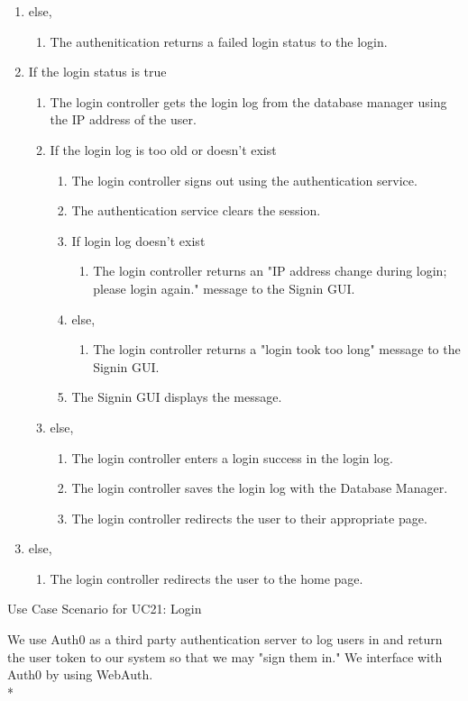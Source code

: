 \documentclass[11pt]{article}
\begin{document}
\begin{table}[H]
{{\begin{enumerate}[label=4.\arabic*.]
			\item else, 
			\begin{enumerate}[label*=\arabic*.]
				\item The authenitication returns a failed login status to the login.
			\end{enumerate}
			\item If the login status is true
			\begin{enumerate}[label*=\arabic*.]
				\item The login controller gets the login log from the database manager using the IP address of the user.
				\item If the login log is too old or doesn't exist
				\begin{enumerate}[label*=\arabic*.]
					\item The login controller signs out using the authentication service.
					\item The authentication service clears the session.
					\item If login log doesn't exist
					\begin{enumerate}[label*=\arabic*.]
						\item The login controller returns an "IP address change during login; please login again." message to the Signin GUI.
					\end{enumerate}
					\item else, 
					\begin{enumerate}[label*=\arabic*.]
						\item The login controller returns a "login took too long" message to the Signin GUI. 
					\end{enumerate}
					\item The Signin GUI displays the message.
				\end{enumerate}
				\item else,
				\begin{enumerate}[label*=\arabic*.]
					\item The login controller enters a login success in the login log.
					\item The login controller saves the login log with the Database Manager.
					\item The login controller redirects the user to their appropriate page. 
				\end{enumerate}
			\end{enumerate}
			\item else,
			\begin{enumerate}[label*=\arabic*.]
				\item The login controller redirects the user to the home page. 
			\end{enumerate}
		\end{enumerate}
	}}
	\caption{Use Case Scenario for UC21: Login}
\end{table}
We use Auth0 as a third party authentication server to log users in and return the user token to our system so that we may "sign them in." We interface with Auth0 by using WebAuth.\\*
\end{document}
